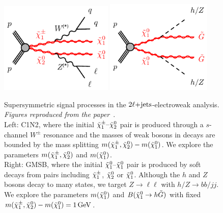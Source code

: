 \begin{figure}[t]
\centering
\includegraphics[width=0.48\textwidth]{figures/2ljets_c1n2_llqqn1n1_wz.pdf}
\hfill
\includegraphics[width=0.45\textwidth]{figures/2ljets_n1n1_hhggzz.pdf}
\caption{%
Supersymmetric signal processes in the $\twoljets$-electroweak
analysis.
\textit{Figures reproduced from the paper}~\cite{atlas2022searches}.
\\[0.5em]
Left: C1N2, where the initial $\chargino_1\textrm{--}\neutralino_2$ pair
is produced through a $s$-channel $W^{\pm}$ resonance and the masses of
weak bosons in decays are bounded by the mass splitting
$m(\chargino_1, \neutralino_2) - m(\neutralino_1)$.
We explore the parameters
$m(\chargino_1, \neutralino_2)$ and $m(\neutralino_1)$.
\\[0.5em]
Right: GMSB, where the initial $\neutralino_1\textrm{--}\neutralino_1$ pair
is produced by soft decays from pairs including $\chargino_1$,
$\neutralino_2$ or $\neutralino_1$.
Although the $h$ and $Z$ bosons decay to many states, we target
$Z\rightarrow \ell\ell$ with
$h/Z\rightarrow bb/jj$.
We explore the parameters
$m(\neutralino_1)$ and $B(\neutralino_1 \rightarrow h \tilde{G})$ with fixed
$m(\chargino_1, \neutralino_2) - m(\neutralino_1) = 1\,\eV[G]$.
}
\label{fig:2ljets_signal_diagrams}
\end{figure}



